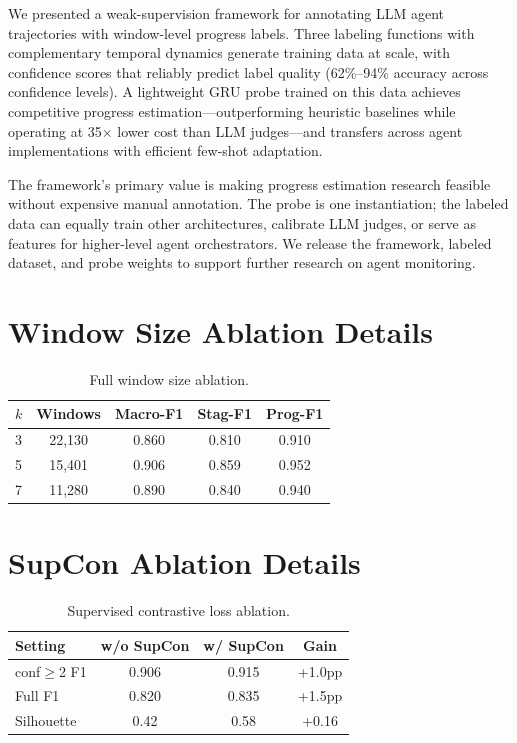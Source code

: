 \documentclass[11pt]{article}
\begin{document}
We presented a weak-supervision framework for annotating LLM agent trajectories with window-level progress labels. Three labeling functions with complementary temporal dynamics generate training data at scale, with confidence scores that reliably predict label quality (62\%--94\% accuracy across confidence levels). A lightweight GRU probe trained on this data achieves competitive progress estimation---outperforming heuristic baselines while operating at 35$\times$ lower cost than LLM judges---and transfers across agent implementations with efficient few-shot adaptation.

The framework's primary value is making progress estimation research feasible without expensive manual annotation. The probe is one instantiation; the labeled data can equally train other architectures, calibrate LLM judges, or serve as features for higher-level agent orchestrators. We release the framework, labeled dataset, and probe weights to support further research on agent monitoring.

%
%

\clearpage
\appendix

\section{Window Size Ablation Details}
\label{app:window}

\begin{table}[h]
\centering
\small
\begin{tabular}{lcccc}
\toprule
$k$ & Windows & Macro-F1 & Stag-F1 & Prog-F1 \\
\midrule
3 & 22,130 & 0.860 & 0.810 & 0.910 \\
5 & 15,401 & 0.906 & 0.859 & 0.952 \\
7 & 11,280 & 0.890 & 0.840 & 0.940 \\
\bottomrule
\end{tabular}
\caption{Full window size ablation.}
\end{table}

\section{SupCon Ablation Details}
\label{app:supcon}

\begin{table}[h]
\centering
\small
\begin{tabular}{lccc}
\toprule
\textbf{Setting} & \textbf{w/o SupCon} & \textbf{w/ SupCon} & \textbf{Gain} \\
\midrule
conf$\geq$2 F1 & 0.906 & 0.915 & +1.0pp \\
Full F1 & 0.820 & 0.835 & +1.5pp \\
Silhouette & 0.42 & 0.58 & +0.16 \\
\bottomrule
\end{tabular}
\caption{Supervised contrastive loss ablation.}
\end{table}
\end{document}
